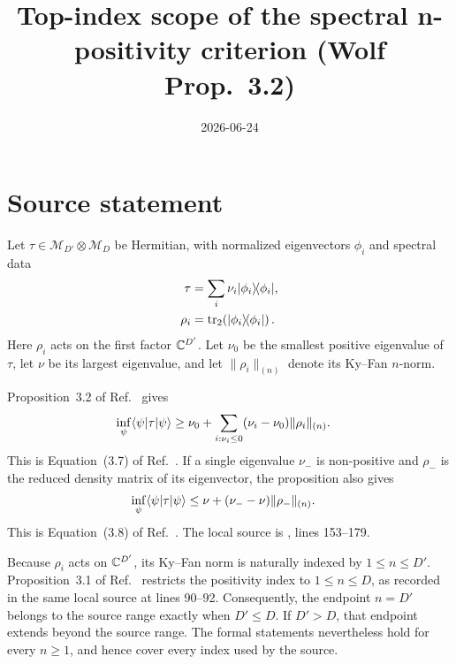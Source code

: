 \documentclass{article}
\title{Top-index scope of the spectral n-positivity criterion (Wolf Prop.~3.2)}
\author{}
\date{2026-06-24}
\begin{document}
\maketitle
{}

\section{Source statement}

Let $\tau\in\mathcal M_{D'}\otimes\mathcal M_D$ be Hermitian, with normalized
eigenvectors $\phi_i$ and spectral data
\begin{align}
    \tau&=\sum_i\nu_i|\phi_i\rangle\!\langle \phi_i|,
    \label{eq:wolf_prop_3_2_top_index_scope_spectral_decomposition}\\
    \rho_i&=\operatorname{tr}_2\!\left(|\phi_i\rangle\!\langle \phi_i|\right).
    \label{eq:wolf_prop_3_2_top_index_scope_reduced_density}
\end{align}
Here $\rho_i$ acts on the first factor $\mathbb{C}^{D'}$. Let $\nu_0$ be the smallest
positive eigenvalue of $\tau$, let $\nu$ be its largest eigenvalue, and let
$\lVert\rho_i\rVert_{(n)}$ denote its Ky--Fan $n$-norm.

Proposition~3.2 of Ref.~\cite{Wolf2012Quantum} gives
\begin{align}
    \inf_\psi\langle \psi|\tau|\psi\rangle
        &\geq \nu_0+
        \sum_{i:\nu_i\leq0}
        (\nu_i-\nu_0)\lVert\rho_i\rVert_{(n)}.
    \label{eq:wolf_prop_3_2_top_index_scope_lower_bound}
\end{align}
This is Equation~(3.7) of Ref.~\cite{Wolf2012Quantum}. If a single eigenvalue
$\nu_-$ is non-positive and $\rho_-$ is the reduced density matrix of its
eigenvector, the proposition also gives
\begin{align}
    \inf_\psi\langle \psi|\tau|\psi\rangle
        &\leq \nu+(\nu_--\nu)\lVert\rho_-\rVert_{(n)}.
    \label{eq:wolf_prop_3_2_top_index_scope_upper_bound}
\end{align}
This is Equation~(3.8) of Ref.~\cite{Wolf2012Quantum}. The local source is
, lines
153--179.

Because $\rho_i$ acts on $\mathbb{C}^{D'}$, its Ky--Fan norm is naturally indexed by
$1\leq n\leq D'$. Proposition~3.1 of Ref.~\cite{Wolf2012Quantum} restricts
the positivity index to $1\leq n\leq D$, as recorded in the same local source
at lines 90--92. Consequently, the endpoint $n=D'$ belongs to the source range
exactly when $D'\leq D$. If $D'>D$, that endpoint extends beyond the source
range. The formal statements nevertheless hold for every $n\geq1$, and hence
cover every index used by the source.
\end{document}
